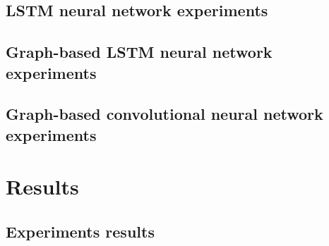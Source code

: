 \subsection{LSTM neural network experiments}
\subsection{Graph-based LSTM neural network experiments}
\subsection{Graph-based convolutional neural network experiments}



\section{Results} \label{sec: results}

\subsection{Experiments results}

